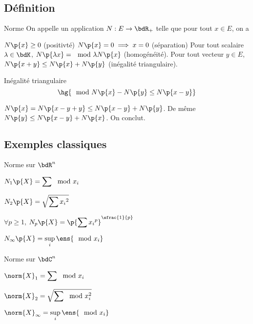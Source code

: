 \documentclass[a4paper,french,bookmarks]{book}
\begin{document}
    \subsection{Définition}
    
    \begin{definition}{Norme}{}
        On appelle  un application $N : E \to \bdR_+$ telle que pour tout $x \in E$, on a 
        \begin{enumerate}
            \itast $N\p{x} \geq 0$ (positivté)
            \itast $N\p{x} = 0 \implies x = 0$ (séparation)
            \itast Pour tout scalaire $\lambda \in \bdK$, $N\p{\lambda x} = \mod{\lambda} N\p{x}$ (homogénéité).
            \itast Pour tout vecteur $y \in E$, $N\p{x + y} \leq N\p{x} + N\p{y}$ (inégalité triangulaire).
        \end{enumerate}
    \end{definition}
    
    \begin{property}{Inégalité triangulaire}{}
        \[ \hg{\mod{N\p{x} - N\p{y}} \leq N\p{x - y}} \]
    \end{property}
    \begin{nproof}
        $N\p{x} = N\p{x - y + y} \leq N\p{x - y} + N\p{y}$. De même $N\p{y} \leq N\p{x - y} + N\p{x}$. On conclut.
    \end{nproof}
    
    \subsection{Exemples classiques}
    
    \begin{example}{Norme sur $\bdR^n$}{}
        \begin{enumerate}
            \itt $\displaystyle N_1\p{X} = \sum \mod{x_i}$
            
            \itt $\displaystyle N_2\p{X} = \sqrt{\sum {x_i}^2}$
            
            \itt $\forall p \geq 1$, $\displaystyle N_p\p{X} = \p{\sum {x_i}^p}^{\sfrac{1}{p}}$
            
            \itt $\displaystyle N_\infty\p{X} = \sup\limits_i\ens{\mod{x_i}}$
        \end{enumerate}
    \end{example}
    
    \begin{example}{Norme sur $\bdC^n$}{}
        \begin{enumerate}
            \itt $\displaystyle \norm{X}_1 = \sum \mod{x_i}$
            
            \itt $\displaystyle \norm{X}_2 = \sqrt{\sum \mod{x_i}^2}$
            
            \itt $\displaystyle \norm{X}_\infty = \sup\limits_i\ens{\mod{x_i}}$
        \end{enumerate}
    \end{example}
    
\end{document}
